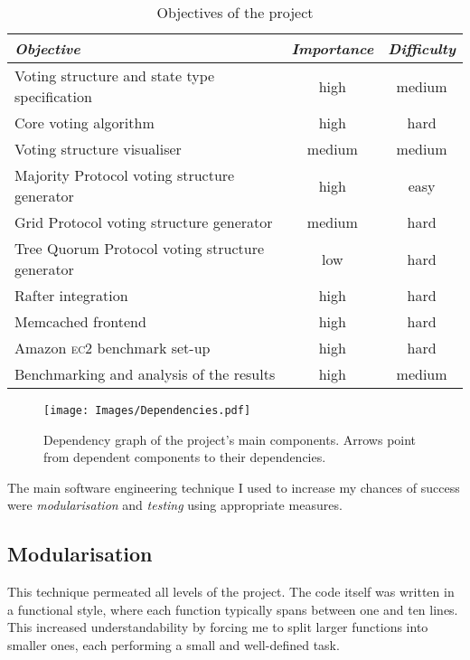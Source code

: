 \documentclass[11pt,chapterprefix=true,toc=bibliography,numbers=noendperiod,
               footnotes=multiple,twoside]{scrreprt}
\newcommand{\ECC}[0]{\textsc{ec}2 }
\begin{document}
\begin{table}[h]
    \centering
    \begin{tabularx}{\textwidth}{X c c}
        \toprule
        \textit{Objective} & \textit{Importance} & \textit{Difficulty} \\
        \midrule
        Voting structure and state type specification & high & medium \\
        Core voting algorithm & high & hard \\
        Voting structure visualiser & medium & medium \\
        Majority Protocol voting structure generator & high & easy \\
        Grid Protocol voting structure generator & medium & hard \\
        Tree Quorum Protocol voting structure generator & low & hard \\
        Rafter integration & high & hard \\
        Memcached frontend & high & hard \\
        Amazon \ECC benchmark set-up & high & hard \\
        Benchmarking and analysis of the results & high & medium \\
        \bottomrule
    \end{tabularx}
    \caption{Objectives of the project}
    \label{tab:objectives}
\end{table}

\begin{figure}[h]
    \centering
    \texttt{[image: Images/Dependencies.pdf]}
    \caption{Dependency graph of the project's main components. Arrows point from dependent components to their dependencies.}
    \label{fig:dependencies}
\end{figure}

The main software engineering technique I used to increase my chances of success were \emph{modularisation} and \emph{testing} using appropriate measures.

\subsection{Modularisation}

This technique permeated all levels of the project. The code itself was written in a functional style, where each function typically spans between one and ten lines. This increased understandability by forcing me to split larger functions into smaller ones, each performing a small and well-defined task.
\end{document}
